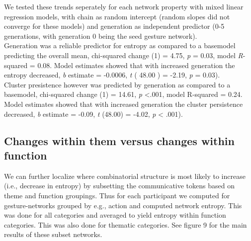 \documentclass[
  man, noextraspace,floatsintext]{apa6}
\begin{document}
We tested these trends seperately for each network property with mixed linear regression models, with chain as random intercept (random slopes did not converge for these models) and generation as independent predictor (0-5 generations, with generation 0 being the seed gesture network).\\
Generation was a reliable predictor for entropy as compared to a basemodel predicting the overall mean, chi-squared change (1) = 4.75, \emph{p} = 0.03, model \emph{R}-squared = 0.08. Model estimates showed that with increased generation the entropy decreased, \emph{b} estimate = -0.0006, \emph{t} ( 48.00 ) = -2.19, \emph{p} = 0.03).\\
Cluster presistence however was predicted by generation as compared to a basemodel, chi-squared change (1) = 14.61, \emph{p} \textless.001, model R-squared = 0.24. Model estimates showed that with increased generation the cluster persistence decreased, \emph{b} estimate = -0.09, \emph{t} (48.00) = -4.02, \emph{p} \textless{} .001).

\hypertarget{changes-within-them-versus-changes-within-function}{%
\subsection{Changes within them versus changes within function}\label{changes-within-them-versus-changes-within-function}}

We can further localize where combinatorial structure is most likely to increase (i.e., decrease in entropy) by subsetting the communicative tokens based on theme and function groupings. Thus for each participant we computed for gesture-networks grouped by e.g., action and computed network entropy. This was done for all categories and averaged to yield entropy within function categories. This was also done for thematic categories. See figure 9 for the main results of these subset networks.

\pagebreak
\end{document}
